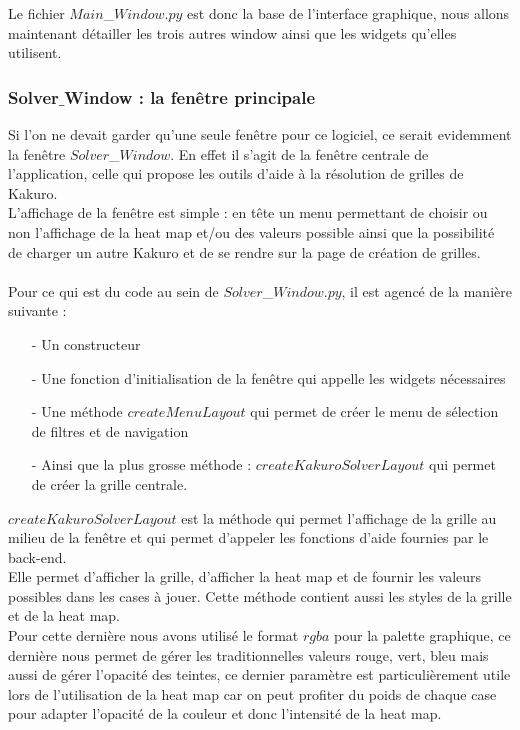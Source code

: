 \documentclass[french,12pt]{article}
\begin{document}
Le fichier $Main$\_$Window.py$ est donc la base de l'interface graphique, nous allons maintenant détailler les trois autres window ainsi que les widgets qu'elles utilisent. 




\subsubsection{Solver$\_$Window : la fenêtre principale}

Si l'on ne devait garder qu'une seule fenêtre pour ce logiciel, ce serait evidemment la fenêtre $Solver$\_$Window$. En effet il s'agit de la fenêtre centrale de l'application, celle qui propose les outils d'aide à la résolution de grilles de Kakuro. \\
L'affichage de la fenêtre est simple : en tête un menu permettant de choisir ou non l'affichage de la heat map et/ou des valeurs possible ainsi que la possibilité de charger un autre Kakuro et de se rendre sur la page de création de grilles. \\ \\

Pour ce qui est du code au sein de $Solver$\_$Window.py$, il est agencé de la manière suivante : \\ 
\begin{itemize}
	\item[-] Un constructeur 
	\item[-] Une fonction d'initialisation de la fenêtre qui appelle les widgets 				nécessaires
	\item[-] Une méthode $createMenuLayout$ qui permet de créer le menu de sélection de filtres et de navigation
	\item[-] Ainsi que la plus grosse méthode : $createKakuroSolverLayout$ qui permet de créer la grille centrale. \\
\end{itemize}

$createKakuroSolverLayout$ est la méthode qui permet l'affichage de la grille au milieu de la fenêtre et qui permet d'appeler les fonctions d'aide fournies par le back-end. \\
Elle permet d'afficher la grille, d'afficher la heat map et de fournir les valeurs possibles dans les cases à jouer. Cette méthode contient aussi les styles de la grille et de la heat map. \\
Pour cette dernière nous avons utilisé le format $rgba$ pour la palette graphique, ce dernière nous permet de gérer les traditionnelles valeurs rouge, vert, bleu mais aussi de gérer l'opacité des teintes, ce dernier paramètre est particulièrement utile lors de l'utilisation de la heat map car on peut profiter du poids de chaque case pour adapter l'opacité de la couleur et donc l'intensité de la heat map. \\ 
\end{document}
